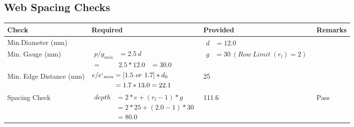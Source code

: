 \documentclass{article}%
\begin{document}
\subsection{Web Spacing Checks}%
\label{subsec:WebSpacingChecks}%
\renewcommand{\arraystretch}{1.2}%
\begin{longtable}{|p{2.5cm}|p{7.5cm}|p{5cm}|p{1cm}|}%
\hline%
\rowcolor{OsdagGreen}%
Check&Required&Provided&Remarks\\%
\hline%
\endhead%
\hline%
Min.Diameter (mm)&&$\begin{aligned} d &=12.0\end{aligned}$&\\%
\hline%
Min. Gauge (mm)&$\begin{aligned}p/g_{min}&= 2.5 ~ d&\\ =&2.5*12.0&=30.0\end{aligned}$&$\begin{aligned} g &=30~(Row~Limit~(r_l) = 2)\end{aligned}$&\\%
\hline%
Min. Edge Distance (mm)&$\begin{aligned}e/e`_{min} &=[1.5~or~ 1.7] * d_0\\ &=1.7*13.0=22.1 \end{aligned}$&25&\\%
\hline%
Spacing Check&$\begin{aligned} depth & = 2 * e + (r_l -1) * g\\ & = 2 * 25+(2.0-1)*30\\ & = 80.0\end{aligned}$&111.6&Pass\\%
\hline%
\end{longtable}

%
\newpage%
\end{document}
